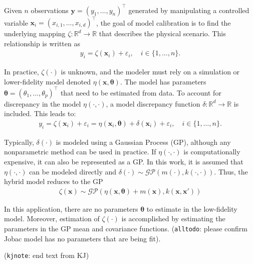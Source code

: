 \documentclass[journal=jacsat,manuscript=article]{achemso}
\newcommand{\kjnote}[1]{{\color{Blue} (\texttt{kjnote}: #1)}}
\newcommand{\alltodo}[1]{{\color{Cyan} (\texttt{alltodo}: #1)}}
\newcommand{\xvec}{\ensuremath{\mathbf{x}}}
\begin{document}
Given $n$ observations $\mathbf{y}=(y_1,\dots,y_n)^\intercal$ generated by manipulating a controlled variable $\xvec_i = (x_{i,1},\dots,x_{i,d})^\intercal$, the goal of model calibration is to find the underlying mapping $\zeta: \mathbb{R}^d \rightarrow \mathbb{R}$ that describes the physical scenario. This relationship is written as
\begin{gather}
    y_i = \zeta(\mathbf{x}_i) + \varepsilon_i, \quad i \in \{1,\dots,n\}. \label{eq: trueprocess}
\end{gather}

In practice, $\zeta(\cdot)$ is unknown, and the modeler must rely on a simulation or lower-fidelity model denoted $\eta(\mathbf{x}, \boldsymbol{\theta})$. The model has parameters $\boldsymbol{\theta}=(\theta_1,\dots,\theta_p)^\intercal$ that need to be estimated from data. To account for discrepancy in the model $\eta(\cdot,\cdot)$, a model discrepancy function $\delta: \mathbb{R}^d \rightarrow \mathbb{R}$ is included. This leads to:
\begin{gather}
     y_i = \zeta(\mathbf{x}_i) + \varepsilon_i = \eta(\mathbf{x}_i,\boldsymbol{\theta}) + \delta(\mathbf{x}_i) + \varepsilon_i, \quad i \in \{1,\dots,n\}.
\end{gather}

Typically, $\delta(\cdot)$ is modeled using a Gaussian Process (GP), although any nonparametric method can be used in practice. If $\eta(\cdot,\cdot)$ is computationally expensive, it can also be represented as a GP. In this work, it is assumed that $\eta(\cdot,\cdot)$ can be modeled directly and $\delta(\cdot)\sim \mathcal{GP}(m(\cdot),k(\cdot,\cdot))$. Thus, the hybrid model reduces to the GP
\begin{gather}
    \zeta(\mathbf{x}) \sim \mathcal{GP}(\eta(\mathbf{x},\boldsymbol{\theta}) + m(\mathbf{x}), k(\mathbf{x}, \mathbf{x}'))
\end{gather}

In this application, there are no parameters $\boldsymbol{\theta}$ to estimate in the low-fidelity model. Moreover, estimation of $\zeta(\cdot)$ is accomplished by estimating the parameters in the GP mean and covariance functions.
\alltodo{please confirm Jobac model has no parameters that are being fit}.

\kjnote{end text from KJ}
\end{document}
